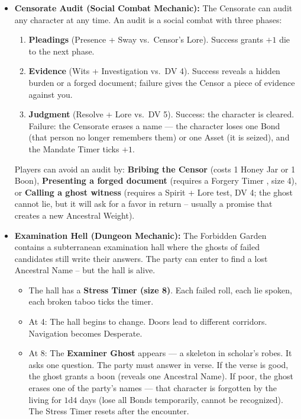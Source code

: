 \begin{itemize}
\item \textbf{Censorate Audit (Social Combat Mechanic):} The Censorate can audit any character at any time. An audit is a social combat with three phases:
  \begin{enumerate}
    \item \textbf{Pleadings} (Presence + Sway vs.\ Censor's Lore). Success grants $+1$ die to the next phase.
    \item \textbf{Evidence} (Wits + Investigation vs.\ DV 4). Success reveals a hidden burden or a forged document; failure gives the Censor a piece of evidence against you.
    \item \textbf{Judgment} (Resolve + Lore vs.\ DV 5). Success: the character is cleared. Failure: the Censorate erases a name --- the character loses one Bond (that person no longer remembers them) or one Asset (it is seized), and the Mandate Timer ticks $+1$.
  \end{enumerate}
  Players can avoid an audit by: \textbf{Bribing the Censor} (costs 1 Honey Jar or 1 Boon), \textbf{Presenting a forged document} (requires a Forgery Timer , size 4), or \textbf{Calling a ghost witness} (requires a Spirit + Lore test, DV 4; the ghost cannot lie, but it will ask for a favor in return -- usually a promise that creates a new Ancestral Weight).

\item \textbf{Examination Hell (Dungeon Mechanic):} The Forbidden Garden contains a subterranean examination hall where the ghosts of failed candidates still write their answers. The party can enter to find a lost Ancestral Name -- but the hall is alive.
  \begin{itemize}
    \item The hall has a \textbf{Stress Timer (size 8)}. Each failed roll, each lie spoken, each broken taboo ticks the timer.
    \item At 4: The hall begins to change. Doors lead to different corridors. Navigation becomes Desperate.
    \item At 8: The \textbf{Examiner Ghost} appears --- a skeleton in scholar's robes. It asks one question. The party must answer in verse. If the verse is good, the ghost grants a boon (reveals one Ancestral Name). If poor, the ghost erases one of the party's names --- that character is forgotten by the living for $1\text{d}4$ days (lose all Bonds temporarily, cannot be recognized). The Stress Timer resets after the encounter.
  \end{itemize}


\end{itemize}
